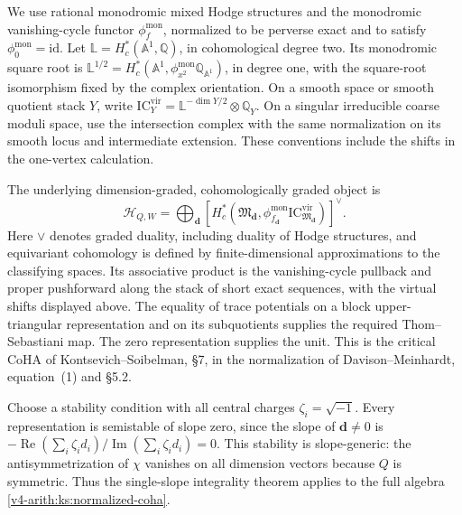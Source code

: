 We use rational monodromic mixed Hodge structures and the monodromic
vanishing-cycle functor $\phi_f^{\mathrm{mon}}$, normalized to be
perverse exact and to satisfy $\phi_0^{\mathrm{mon}}=\mathrm{id}$.
Let $\mathbb L=H_c^*(\mathbb A^1,\mathbb Q)$, in cohomological
degree two. Its monodromic square root is
$\mathbb L^{1/2}=H_c^*(\mathbb A^1,\phi_{x^2}^{\mathrm{mon}}
\mathbb Q_{\mathbb A^1})$, in degree one, with the square-root
isomorphism fixed by the complex orientation. On a smooth space or smooth quotient
stack $Y$, write
$\mathrm{IC}_Y^{\mathrm{vir}}=\mathbb L^{-\dim Y/2}\otimes\mathbb Q_Y$.
On a singular irreducible coarse moduli space, use the intersection
complex with the same normalization on its smooth locus and
intermediate extension. These conventions include the shifts in the
one-vertex calculation.

\begin{definition}
\label{v4-arith:thm:KS-CoHA}
The underlying dimension-graded, cohomologically graded object is
\begin{equation}
 \mathcal H_{Q,W}
 =\bigoplus_{\mathbf d}
 \left[
 H_c^*(\mathfrak M_{\mathbf d},
       \phi_{f_{\mathbf d}}^{\mathrm{mon}}
       \mathrm{IC}_{\mathfrak M_{\mathbf d}}^{\mathrm{vir}})
 \right]^\vee.
 \label{v4-arith:ks:normalized-coha}
\end{equation}
Here $\vee$ denotes graded duality, including duality of Hodge
structures, and equivariant cohomology is defined by finite-dimensional
approximations to the classifying spaces. Its associative product is
the vanishing-cycle pullback and proper pushforward along the stack
of short exact sequences, with the virtual shifts displayed above.
The equality of trace potentials on a block upper-triangular
representation and on its subquotients supplies the required
Thom--Sebastiani map. The zero representation supplies the unit.
This is the critical CoHA of Kontsevich--Soibelman, \S7, in the
normalization of Davison--Meinhardt, equation~(1) and \S5.2.
\end{definition}

Choose a stability condition with all central charges $\zeta_i=\sqrt{-1}$.
Every representation is semistable of slope zero, since the slope
of $\mathbf d\ne0$ is
$-\operatorname{Re}(\sum_i\zeta_i d_i)/
\operatorname{Im}(\sum_i\zeta_i d_i)=0$.
This stability is slope-generic: the antisymmetrization of $\chi$
vanishes on all dimension vectors because $Q$ is symmetric.
Thus the single-slope integrality theorem applies to the full algebra
\eqref{v4-arith:ks:normalized-coha}.

